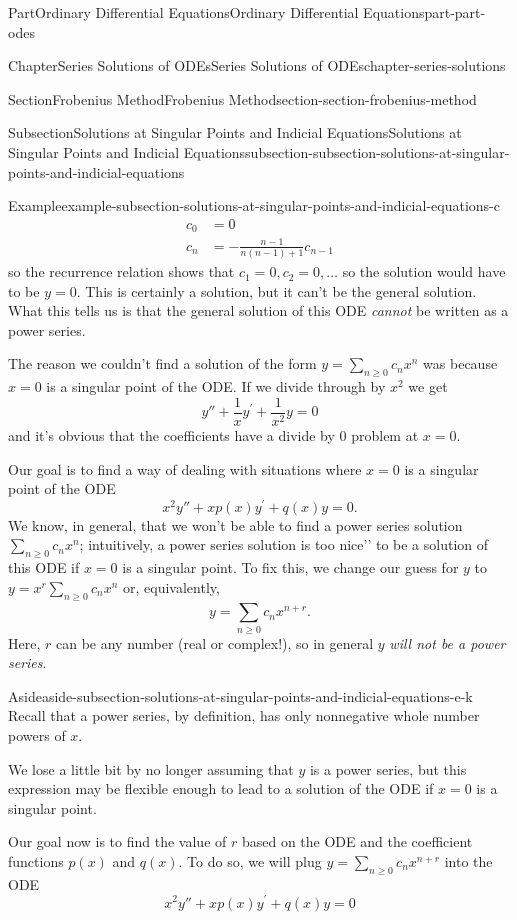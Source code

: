 \documentclass[twoside,10pt,]{book}
\numberwithin{equation}{part}
\begin{document}
\begin{partptx}{Part}{Ordinary Differential Equations}{}{Ordinary Differential Equations}{}{}{part-part-odes}
\begin{chapterptx}{Chapter}{Series Solutions of ODEs}{}{Series Solutions of ODEs}{}{}{chapter-series-solutions}
\begin{sectionptx}{Section}{Frobenius Method}{}{Frobenius Method}{}{}{section-section-frobenius-method}
\begin{subsectionptx}{Subsection}{Solutions at Singular Points and Indicial Equations}{}{Solutions at Singular Points and Indicial Equations}{}{}{subsection-subsection-solutions-at-singular-points-and-indicial-equations}
\begin{example}{Example}{}{example-subsection-solutions-at-singular-points-and-indicial-equations-c}
\begin{align*}
c_{0} &= 0\\
c_{n} &= -\frac{n-1}{n(n-1)+1}c_{n-1}
\end{align*}
so the recurrence relation shows that \(c_{1} = 0, c_{2} = 0,\ldots\) so the solution would have to be \(y=0\). This is certainly a solution, but it can't be the general solution. What this tells us is that the general solution of this ODE \emph{cannot} be written as a power series.%
\end{example}
The reason we couldn't find a solution of the form \(y=\sum_{n\geq0}^{}c_{n}x^{n}\) was because \(x=0\) is a singular point of the ODE. If we divide through by \(x^{2}\) we get%
\begin{equation*}
y''+\frac{1}{x}y^\prime+\frac{1}{x^{2}}y = 0
\end{equation*}
and it's obvious that the coefficients have a divide by \(0\) problem at \(x=0\).%
\par
Our goal is to find a way of dealing with situations where \(x=0\) is a singular point of the ODE%
\begin{equation*}
x^{2}y''+xp(x)y^\prime+q(x)y=0.
\end{equation*}
We know, in general, that we won't be able to find a power series solution \(\sum_{n\geq0}^{}c_{n}x^{n}\); intuitively, a power series solution is too \textasciigrave{}\textasciigrave{}nice'{}'{} to be a solution of this ODE if \(x=0\) is a singular point. To fix this, we change our guess for \(y\) to \(y=x^{r}\sum_{n\geq0}^{}c_{n}x^{n}\) or, equivalently,%
\begin{equation*}
y = \sum_{n\geq0}^{}c_{n}x^{n+r}.
\end{equation*}
Here, \(r\) can be any number (real or complex!), so in general \(y\) \emph{will not be a power series}. \begin{aside}{Aside}{}{aside-subsection-solutions-at-singular-points-and-indicial-equations-e-k}%
Recall that a power series, by definition, has only nonnegative whole number powers of \(x\).%
\end{aside}
 We lose a little bit by no longer assuming that \(y\) is a power series, but this expression may be flexible enough to lead to a solution of the ODE if \(x=0\) is a singular point.%
\par
Our goal now is to find the value of \(r\) based on the ODE and the coefficient functions \(p(x)\) and \(q(x)\). To do so, we will plug \(y=\sum_{n\geq0}^{}c_{n}x^{n+r}\) into the ODE%
\begin{equation*}
x^{2}y''+xp(x)y^\prime+q(x)y = 0
\end{equation*}

\end{subsectionptx}
\end{sectionptx}
\end{chapterptx}
\end{partptx}
\end{document}
